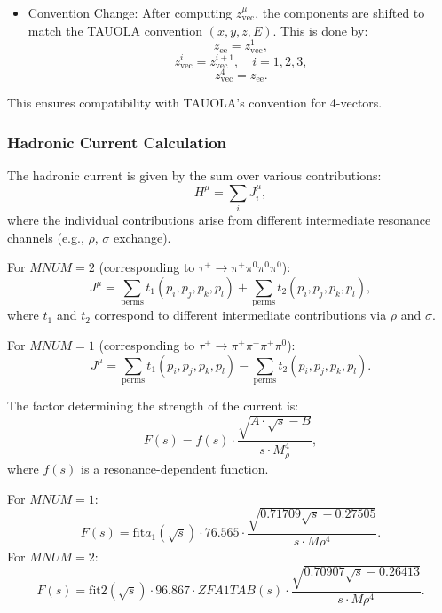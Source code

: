 \documentclass[12pt]{article}
\begin{document}
\begin{itemize}
\item  Convention Change:
After computing \( z_{\text{vec}}^\mu \), the components are shifted to match the TAUOLA convention \((x,y,z,E)\). This is done by:
\[
z_{\text{ee}} = z_{\text{vec}}^1,
\]
\[
z_{\text{vec}}^i = z_{\text{vec}}^{i+1}, \quad i = 1,2,3,
\]
\[
z_{\text{vec}}^4 = z_{\text{ee}}.
\]



\end{itemize}
This ensures compatibility with TAUOLA's convention for 4-vectors.


\subsubsection{Hadronic Current Calculation}
The hadronic current is given by the sum over various contributions:
\begin{equation}
H^\mu = \sum_{i} J_i^\mu,
\end{equation}
where the individual contributions arise from different intermediate resonance channels (e.g., $\rho$, $\sigma$ exchange).

For $MNUM = 2$ (corresponding to $\tau^+ \to \pi^+ \pi^0 \pi^0 \pi^0$):
\begin{equation}
J^\mu = \sum_{\text{perms}} t_1(p_i, p_j, p_k, p_l) + \sum_{\text{perms}} t_2(p_i, p_j, p_k, p_l),
\end{equation}
where $t_1$ and $t_2$ correspond to different intermediate contributions via $\rho$ and $\sigma$.

For $MNUM = 1$ (corresponding to $\tau^+ \to \pi^+ \pi^- \pi^+ \pi^0$):
\begin{equation}
J^\mu = \sum_{\text{perms}} t_1(p_i, p_j, p_k, p_l) - \sum_{\text{perms}} t_2(p_i, p_j, p_k, p_l).
\end{equation}

The factor determining the strength of the current is:
\begin{equation}
F(s) = f(s) \cdot \frac{\sqrt{A \cdot \sqrt{s} - B}}{s \cdot M_{\rho}^{4}},
\end{equation}
where $f(s)$ is a resonance-dependent function.

For $MNUM = 1$:
\begin{equation}
F(s) = \text{fit}{a_1}(\sqrt{s}) \cdot 76.565 \cdot \frac{\sqrt{0.71709 \sqrt{s} - 0.27505}}{s \cdot M{\rho}^{4}}.
\end{equation}
For $MNUM = 2$:
\begin{equation}
F(s) = \text{fit}2(\sqrt{s}) \cdot 96.867 \cdot ZFA1TAB(s) \cdot \frac{\sqrt{0.70907 \sqrt{s} - 0.26413}}{s \cdot M{\rho}^{4}}.
\end{equation}
\end{document}
